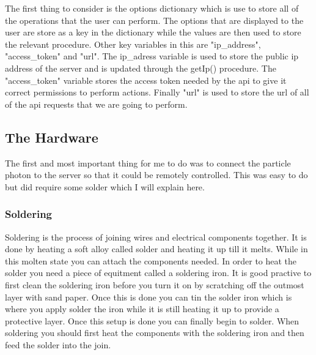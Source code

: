 \documentclass{article}
\begin{document}
The first thing to consider is the options dictionary which is use to store all of
the operations that the user can perform. The options that are displayed to the user
are store as a key in the dictionary while the values are then used to store the
relevant procedure. Other key variables in this are "ip\_address", "access\_token"
and "url". The ip\_adress variable is used to store the public ip address of the server
and is updated through the getIp() procedure. The "access\_token" variable stores
the access token needed by the api to give it correct permissions to perform actions.
Finally "url" is used to store the url of all of the api requests that we are going to
perform.

\subsection{The Hardware}
The first and most important thing for me to do was to connect the particle photon to the
server so that it could be remotely controlled. This was easy to do but did require some
solder which I will explain here.

\subsubsection{Soldering}
Soldering is the process of joining wires and electrical components together. It is done
by heating a soft alloy called solder and heating it up till it melts. While in this molten
state you can attach the components needed. In order to heat the solder you need a piece of
equitment called a soldering iron. It is good practive to first clean the soldering iron
before you turn it on by scratching off the outmost layer with sand paper. Once this is
done you can tin the solder iron which is where you apply solder the iron while it is still
heating it up to provide a protective layer. Once this setup is done you can finally begin to
solder. When soldering you should first heat the components with the soldering iron and then
feed the solder into the join.
\end{document}
